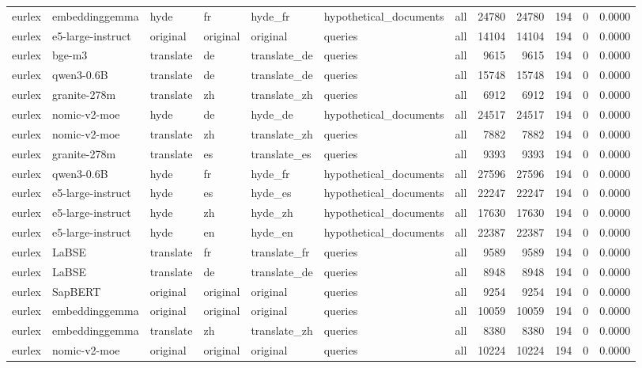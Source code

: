\begin{tabular}{lllllllrrrrr}
eurlex & embeddinggemma & hyde & fr & hyde\_fr & hypothetical\_documents & all & 24780 & 24780 & 194 & 0 & 0.0000 \\
eurlex & e5-large-instruct & original & original & original & queries & all & 14104 & 14104 & 194 & 0 & 0.0000 \\
eurlex & bge-m3 & translate & de & translate\_de & queries & all & 9615 & 9615 & 194 & 0 & 0.0000 \\
eurlex & qwen3-0.6B & translate & de & translate\_de & queries & all & 15748 & 15748 & 194 & 0 & 0.0000 \\
eurlex & granite-278m & translate & zh & translate\_zh & queries & all & 6912 & 6912 & 194 & 0 & 0.0000 \\
eurlex & nomic-v2-moe & hyde & de & hyde\_de & hypothetical\_documents & all & 24517 & 24517 & 194 & 0 & 0.0000 \\
eurlex & nomic-v2-moe & translate & zh & translate\_zh & queries & all & 7882 & 7882 & 194 & 0 & 0.0000 \\
eurlex & granite-278m & translate & es & translate\_es & queries & all & 9393 & 9393 & 194 & 0 & 0.0000 \\
eurlex & qwen3-0.6B & hyde & fr & hyde\_fr & hypothetical\_documents & all & 27596 & 27596 & 194 & 0 & 0.0000 \\
eurlex & e5-large-instruct & hyde & es & hyde\_es & hypothetical\_documents & all & 22247 & 22247 & 194 & 0 & 0.0000 \\
eurlex & e5-large-instruct & hyde & zh & hyde\_zh & hypothetical\_documents & all & 17630 & 17630 & 194 & 0 & 0.0000 \\
eurlex & e5-large-instruct & hyde & en & hyde\_en & hypothetical\_documents & all & 22387 & 22387 & 194 & 0 & 0.0000 \\
eurlex & LaBSE & translate & fr & translate\_fr & queries & all & 9589 & 9589 & 194 & 0 & 0.0000 \\
eurlex & LaBSE & translate & de & translate\_de & queries & all & 8948 & 8948 & 194 & 0 & 0.0000 \\
eurlex & SapBERT & original & original & original & queries & all & 9254 & 9254 & 194 & 0 & 0.0000 \\
eurlex & embeddinggemma & original & original & original & queries & all & 10059 & 10059 & 194 & 0 & 0.0000 \\
eurlex & embeddinggemma & translate & zh & translate\_zh & queries & all & 8380 & 8380 & 194 & 0 & 0.0000 \\
eurlex & nomic-v2-moe & original & original & original & queries & all & 10224 & 10224 & 194 & 0 & 0.0000 \\

\end{tabular}
